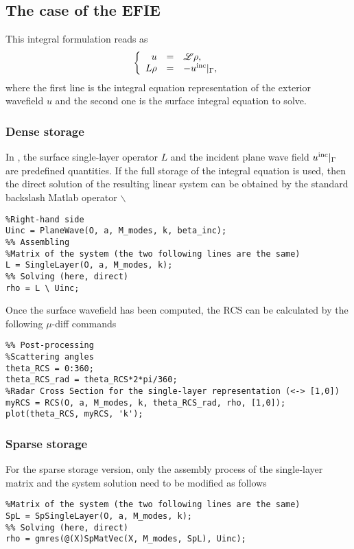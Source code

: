 \subsection{The case of the EFIE}


This integral formulation reads as
$$
\left\{\begin{array}{r c l}
u &=& {\mathscr L}\rho,\\
L\rho &=& -u^{\textrm{inc}}|_{\Gamma},
\end{array}\right.
$$
where the first line is the integral equation representation of the exterior wavefield $u$ and the second one is  the surface 
integral equation to solve. 

\subsubsection{Dense storage}

In \mudiff, the surface single-layer operator $L$ and the incident plane wave field $u^{\textrm{inc}}|_{\Gamma}$ are  predefined quantities.
If the full storage of the integral equation is used, then the direct solution of the resulting linear system can be
obtained by the standard backslash Matlab operator $\backslash$ 
\begin{lstlisting}
%Right-hand side
Uinc = PlaneWave(O, a, M_modes, k, beta_inc);
%% Assembling
%Matrix of the system (the two following lines are the same)
L = SingleLayer(O, a, M_modes, k);
%% Solving (here, direct)
rho = L \ Uinc;
\end{lstlisting}
\medskip

Once the surface wavefield has been computed, the RCS can be calculated by the following $\mu$-diff  commands
\begin{lstlisting}
%% Post-processing
%Scattering angles 
theta_RCS = 0:360;
theta_RCS_rad = theta_RCS*2*pi/360;
%Radar Cross Section for the single-layer representation (<-> [1,0])
myRCS = RCS(O, a, M_modes, k, theta_RCS_rad, rho, [1,0]);
plot(theta_RCS, myRCS, 'k');
\end{lstlisting}

\subsubsection{Sparse storage}

For the sparse storage version, only the assembly process of the single-layer matrix and the system solution
need to be modified as follows
\begin{lstlisting}
%Matrix of the system (the two following lines are the same)
SpL = SpSingleLayer(O, a, M_modes, k);
%% Solving (here, direct)
rho = gmres(@(X)SpMatVec(X, M_modes, SpL), Uinc);
\end{lstlisting}
\medskip

